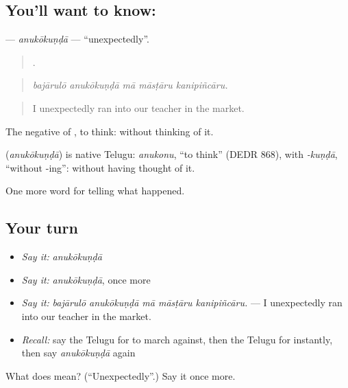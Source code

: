 \subsection*{You'll want to know: }
\textbf{} — \emph{anukōkuṇḍā} — \textquotedblleft{}unexpectedly\textquotedblright{}.

\begin{quote}
    .
\end{quote}

\begin{quote}
\emph{bajārulō anukōkuṇḍā mā māsṭāru kanipiñcāru.}
\end{quote}

\begin{quote}
I unexpectedly ran into our teacher in the market.
\end{quote}

The negative of , to think: without thinking of it.

\begin{cousinweb}
\textbf{} (\emph{anukōkuṇḍā}) is native Telugu: \emph{anukonu}, \textquotedblleft{}to think\textquotedblright{} (DEDR 868), with \emph{-kuṇḍā}, \textquotedblleft{}without -ing\textquotedblright{}: without having thought of it.
\end{cousinweb}

\begin{grammarlens}[title={What you've built}]
One more word for telling what happened.
\end{grammarlens}

\subsection*{Your turn}
\begin{itemize}
\raggedright
  \item \emph{Say it:} \emph{anukōkuṇḍā}
  \item \emph{Say it:} \emph{anukōkuṇḍā}, once more
  \item \emph{Say it:} \emph{bajārulō anukōkuṇḍā mā māsṭāru kanipiñcāru.} — I unexpectedly ran into our teacher in the market.
  \item \emph{Recall:} say the Telugu for to march against, then the Telugu for instantly, then say \emph{anukōkuṇḍā} again
\end{itemize}

\begin{tcolorbox}[breakable,colback=teal!4,colframe=teal!35!black,title={Before you move on}]
What does  mean? (\textquotedblleft{}Unexpectedly\textquotedblright{}.) Say it once more.
\end{tcolorbox}
